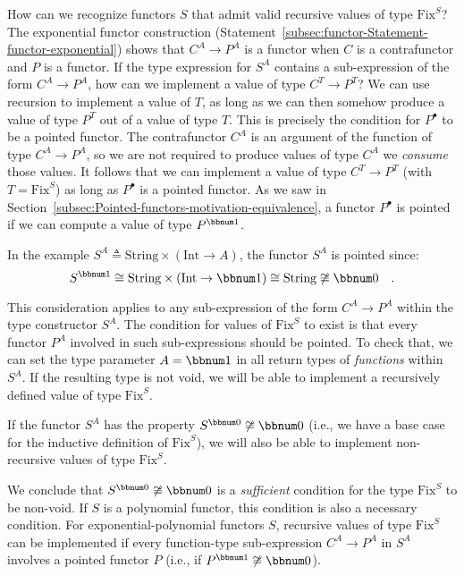 How can we recognize functors $S$ that admit valid recursive values
of type $\text{Fix}^{S}$? The exponential functor construction (Statement~\ref{subsec:functor-Statement-functor-exponential})
shows that $C^{A}\rightarrow P^{A}$ is a functor when $C$ is a contrafunctor
and $P$ is a functor. If the type expression for $S^{A}$ contains
a sub-expression of the form $C^{A}\rightarrow P^{A}$, how can we
implement a value of type $C^{T}\rightarrow P^{T}$? We can use recursion
to implement a value of $T$, as long as we can then somehow produce
a value of type $P^{T}$ out of a value of type $T$. This is precisely
the condition for $P^{\bullet}$ to be a pointed functor. The contrafunctor
$C^{A}$ is an argument of the function of type $C^{A}\rightarrow P^{A}$,
so we are not required to produce values of type $C^{A}$\textemdash{}
we \emph{consume} those values. It follows that we can implement a
value of type $C^{T}\rightarrow P^{T}$ (with $T=\text{Fix}^{S}$)
as long as $P^{\bullet}$ is a pointed functor. As we saw in Section~\ref{subsec:Pointed-functors-motivation-equivalence},
a functor $P^{\bullet}$ is pointed if we can compute a value of type
$P^{\bbnum 1}$.

In the example $S^{A}\triangleq\text{String}\times(\text{Int}\rightarrow A)$,
the functor $S^{A}$ is pointed since:
\[
S^{\bbnum 1}\cong\text{String}\times(\text{Int}\rightarrow\bbnum 1)\cong\text{String}\not\cong\bbnum 0\quad.
\]

This consideration applies to any sub-expression of the form $C^{A}\rightarrow P^{A}$
within the type constructor $S^{A}$. The condition for values of
$\text{Fix}^{S}$ to exist is that every functor $P^{A}$ involved
in such sub-expressions should be pointed. To check that, we can set
the type parameter $A=\bbnum 1$ in all return types of \emph{functions}
within $S^{A}$. If the resulting type is not void, we will be able
to implement a recursively defined value of type $\text{Fix}^{S}$.

If the functor $S^{A}$ has the property $S^{\bbnum 0}\not\cong\bbnum 0$
(i.e., we have a base case for the inductive definition of $\text{Fix}^{S}$),
we will also be able to implement non-recursive values of type $\text{Fix}^{S}$.

We conclude that $S^{\bbnum 0}\not\cong\bbnum 0$ is a \emph{sufficient}
condition for the type $\text{Fix}^{S}$ to be non-void. If $S$ is
a polynomial functor, this condition is also a necessary condition.
For exponential-polynomial functors $S$, recursive values of type
$\text{Fix}^{S}$ can be implemented if every function-type sub-expression
$C^{A}\rightarrow P^{A}$ in $S^{A}$ involves a pointed functor $P$
(i.e., if $P^{\bbnum 1}\not\cong\bbnum 0$).

